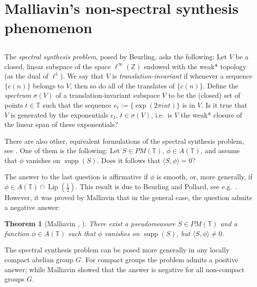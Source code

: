 \documentclass[reqno,a4paper,12pt]{amsart}
\numberwithin{equation}{section}
\numberwithin{figure}{section}
\newcommand\Z{\mathbb{Z}}
\newcommand\T{\mathbb{T}}
\newcommand\sig{\sigma}
\newcommand\1{\mathds{1}}
\newcommand{\dotprod}[2]{\langle #1 , #2 \rangle}
\newcommand{\supp}{\operatorname{supp}}
\newcommand{\half}{\tfrac{1}{2}}
\theoremstyle{plain}
\newtheorem{thm}{Theorem}[section]
\theoremstyle{definition}
\begin{document}


\section{Malliavin's non-spectral synthesis phenomenon} \label{secM1}


\subsection{}
The \emph{spectral synthesis problem},  posed by
Beurling, asks the following:
Let $V$ be a closed,
 linear subspace of the space $\ell^\infty(\Z)$
endowed with the weak* topology (as the dual of $\ell^1$).
We say that $V$ is \emph{translation-invariant}
if whenever a sequence $\{c(n)\}$ 
belongs to $V$, then so do all of the translates of
 $\{c(n)\}$.
Define the  \emph{spectrum} $\sigma(V)$ of a
translation-invariant subspace $V$ to be
the (closed) set of points $t \in \T$
such that the  sequence
$e_t := \{\exp (2 \pi i n t)\}$ is in $V$.
Is it true that $V$ is generated by the exponentials
$e_t$, $t \in \sig(V)$, i.e.\  is $V$ the weak* closure
of the linear span of these exponentials?

There are 
also other, equivalent
formulations of the 
spectral synthesis problem,
see  \cite[Chapter IX]{KS94}.
 One of them is the following:
Let $S \in PM(\T)$, $\phi \in A(\T)$, and
assume that $\phi$ vanishes on $\supp(S)$.
Does it follows that
$\dotprod{S}{\phi}=0$?



The answer to the last question is affirmative if $\phi$ is smooth, or,
more generally, if $\phi \in A(\T) \cap \operatorname{Lip}(\half)$.
This result is due to Beurling and Pollard, 
see e.g.\ \cite[Chapter V, Section 5]{Kah70}.
However, it was proved by Malliavin
  that in the general case,
the question admits a negative answer:



 \begin{thm}[Malliavin \cite{Mal59a}, \cite{Mal59b}]
\label{thmM1.1}
There exist 
a pseudomeasure $S \in PM(\T)$
and 
a function $\phi \in A(\T)$ 
such that
$\phi$ vanishes on $\supp(S)$,
but $\dotprod{S}{\phi} \neq 0$.
\end{thm}


The spectral synthesis problem can be posed more generally 
in any locally compact abelian group $G$. 
For compact groups the problem admits a positive answer;
while Malliavin showed \cite{Mal59c} that the answer
is negative for all non-compact groups $G$.
\end{document}
